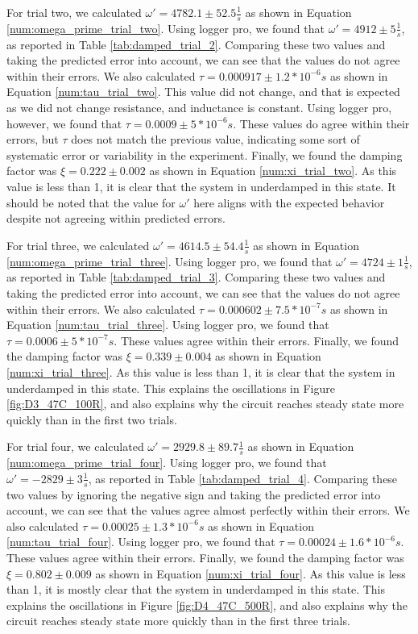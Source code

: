 \documentclass[12pt]{article}
\begin{document}
For trial two, we calculated $\omega'=4782.1\pm52.5\frac{1}{s}$ as shown in Equation \ref{num:omega_prime_trial_two}. Using logger pro, we found that $\omega'=4912\pm5\frac{1}{s}$, as reported in Table \ref{tab:damped_trial_2}. Comparing these two values and taking the predicted error into account, we can see that the values do not agree within their errors. We also calculated $\tau=0.000917\pm1.2*10^{-6} s$ as shown in Equation \ref{num:tau_trial_two}. This value did not change, and that is expected as we did not change resistance, and inductance is constant. Using logger pro, however, we found that $\tau=0.0009\pm5*10^{-6} s$. These values do agree within their errors, but $\tau$ does not match the previous value, indicating some sort of systematic error or variability in the experiment. Finally, we found the damping factor was $\xi=0.222\pm0.002$ as shown in Equation \ref{num:xi_trial_two}. As this value is less than 1, it is clear that the system in underdamped in this state. It should be noted that the value for $\omega'$ here aligns with the expected behavior despite not agreeing within predicted errors.

For trial three, we calculated $\omega'=4614.5\pm54.4\frac{1}{s}$ as shown in Equation \ref{num:omega_prime_trial_three}. Using logger pro, we found that $\omega'=4724\pm1\frac{1}{s}$, as reported in Table \ref{tab:damped_trial_3}. Comparing these two values and taking the predicted error into account, we can see that the values do not agree within their errors. We also calculated $\tau=0.000602\pm7.5*10^{-7} s$ as shown in Equation \ref{num:tau_trial_three}. Using logger pro, we found that $\tau=0.0006\pm5*10^{-7} s$. These values agree within their errors. Finally, we found the damping factor was $\xi=0.339\pm0.004$ as shown in Equation \ref{num:xi_trial_three}. As this value is less than 1, it is clear that the system in underdamped in this state. This explains the oscillations in Figure \ref{fig:D3_47C_100R}, and also explains why the circuit reaches steady state more quickly than in the first two trials.

For trial four, we calculated $\omega'=2929.8\pm89.7\frac{1}{s}$ as shown in Equation \ref{num:omega_prime_trial_four}. Using logger pro, we found that $\omega'=-2829\pm3\frac{1}{s}$, as reported in Table \ref{tab:damped_trial_4}. Comparing these two values by ignoring the negative sign and taking the predicted error into account, we can see that the values agree almost perfectly within their errors. We also calculated $\tau=0.00025\pm1.3*10^{-6} s$ as shown in Equation \ref{num:tau_trial_four}. Using logger pro, we found that $\tau=0.00024\pm1.6*10^{-6} s$. These values agree within their errors. Finally, we found the damping factor was $\xi=0.802\pm0.009$ as shown in Equation \ref{num:xi_trial_four}. As this value is less than 1, it is mostly clear that the system in underdamped in this state. This explains the oscillations in Figure \ref{fig:D4_47C_500R}, and also explains why the circuit reaches steady state more quickly than in the first three trials.
\end{document}
